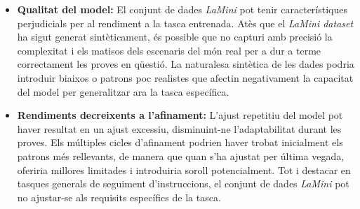 \begin{itemize}
  \item \textbf{Qualitat del model:} El conjunt de dades \textit{LaMini} pot tenir característiques perjudicials per al rendiment a la tasca entrenada. Atès que el \textit{LaMini dataset} ha sigut generat sintèticament, és possible que no capturi amb precisió la complexitat i els matisos dels escenaris del món real per a dur a terme correctament les proves en qüestió. La naturalesa sintètica de les dades podria introduir biaixos o patrons poc realistes que afectin negativament la capacitat del model per generalitzar ara la tasca específica.
  \item \textbf{Rendiments decreixents a l'afinament:} L'ajust repetitiu del model pot haver resultat en un ajust excessiu, disminuint-ne l'adaptabilitat durant les proves. Els múltiples cicles d'afinament podrien haver trobat inicialment els patrons més rellevants, de manera que quan s'ha ajustat per última vegada, oferiria millores limitades i introduiria soroll potencialment. Tot i destacar en tasques generals de seguiment d'instruccions, el conjunt de dades \textit{LaMini} pot no ajustar-se als requisits específics de la tasca.
\end{itemize}


